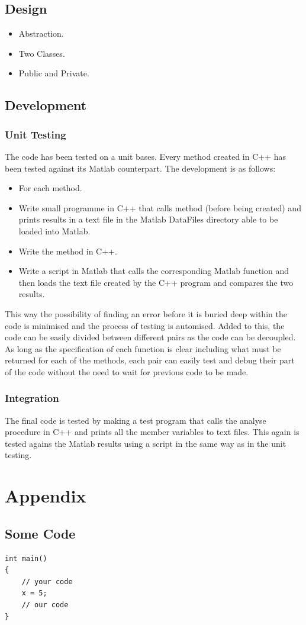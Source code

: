 \documentclass[a4paper]{article}
\begin{document}
\subsection{Design}
\begin{itemize}
\item Abstraction.
\item Two Classes.
\item Public and Private.
\end{itemize}
\subsection{Development}
\subsubsection{Unit Testing}
\noindent 
The code has been tested on a unit bases. Every method created in C++ has been tested against its Matlab counterpart. The development is as follows:
\begin{itemize}
\item For each method. 
\item Write small programme in C++ that calls method (before being created) and prints results in a text file in the Matlab DataFiles directory able to be loaded into Matlab.
\item Write the method in C++.
\item Write a script in Matlab that calls the corresponding Matlab function and then loads the text file created by the C++ program and compares the two results.
\end{itemize}
\noindent
This way the possibility of finding an error before it is buried deep within the code is minimised and the process of testing is automised. Added to this, the code can be easily divided between different pairs as the code can be decoupled. As long as the specification of each function is clear including what must be returned for each of the methods, each pair can easily test and debug their part of the code without the need to wait for previous code to be made.

\subsubsection{Integration}
\noindent
The final code is tested by making a test program that calls the analyse procedure in C++ and prints all the member variables to text files. This again is tested agains the Matlab results using a script in the same way as in the unit testing.   


\clearpage
\section*{Appendix}
\subsection*{Some Code}
\begin{lstlisting}
int main()
{
	// your code
	x = 5;
	// our code
}

\end{lstlisting}
\end{document}
